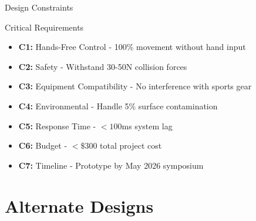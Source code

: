 \documentclass[aspectratio=169]{beamer}
\begin{document}
\begin{frame}{Design Constraints}
\begin{block}{Critical Requirements}
\begin{itemize}
    \item \textbf{C1:} Hands-Free Control - 100\% movement without hand input
    \item \textbf{C2:} Safety - Withstand 30-50N collision forces
    \item \textbf{C3:} Equipment Compatibility - No interference with sports gear
    \item \textbf{C4:} Environmental - Handle 5\% surface contamination
    \item \textbf{C5:} Response Time - $<100$ms system lag
    \item \textbf{C6:} Budget - $<\$300$ total project cost
    \item \textbf{C7:} Timeline - Prototype by May 2026 symposium
\end{itemize}
\end{block}
\end{frame}

\section{Alternate Designs}
\end{document}
